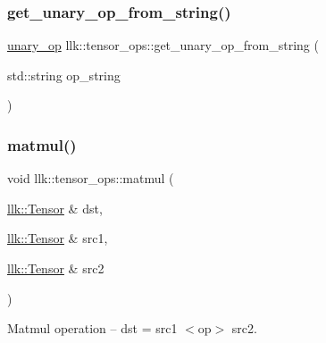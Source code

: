 \mbox{\label{namespacellk_1_1tensor__ops_afb8428deeda6bd3a1a0f2ff7518bc5fa}} 
\subsubsection{\texorpdfstring{get\+\_\+unary\+\_\+op\+\_\+from\+\_\+string()}{get\_unary\_op\_from\_string()}}
{\footnotesize\ttfamily \hyperlink{namespacellk_1_1tensor__ops_a5fae70cbcf6cd7aadca4a04278614633}{unary\+\_\+op} llk\+::tensor\+\_\+ops\+::get\+\_\+unary\+\_\+op\+\_\+from\+\_\+string (\begin{DoxyParamCaption}\item[{std\+::string}]{op\+\_\+string }\end{DoxyParamCaption})}

\mbox{\label{namespacellk_1_1tensor__ops_adcbf09725b122e136e6fc4f90c34a909}} 
\subsubsection{\texorpdfstring{matmul()}{matmul()}}
{\footnotesize\ttfamily void llk\+::tensor\+\_\+ops\+::matmul (\begin{DoxyParamCaption}\item[{\hyperlink{classllk_1_1Tensor}{llk\+::\+Tensor} \&}]{dst,  }\item[{\hyperlink{classllk_1_1Tensor}{llk\+::\+Tensor} \&}]{src1,  }\item[{\hyperlink{classllk_1_1Tensor}{llk\+::\+Tensor} \&}]{src2 }\end{DoxyParamCaption})}



Matmul operation -- dst = src1 $<$op$>$ src2. 

\mbox{\label{namespacellk_1_1tensor__ops_ad76f0782652afbdf1f6032e44cae4288}} 
